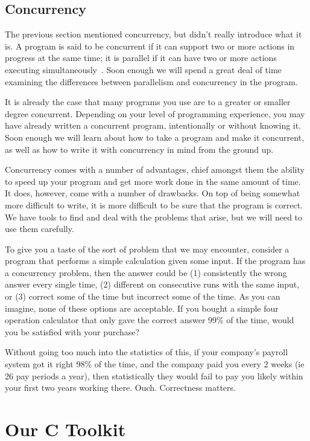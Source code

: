 \subsection*{Concurrency}

The previous section mentioned concurrency, but didn't really introduce what it is. A program is said to be concurrent if it can support two or more actions in progress at the same time; it is parallel if it can have two or more actions executing simultaneously~\cite{artofc}. Soon enough we will spend a great deal of time examining the differences between parallelism and concurrency in the program.

It is already the case that many programs you use are to a greater or smaller degree concurrent. Depending on your level of programming experience, you may have already written a concurrent program, intentionally or without knowing it. Soon enough we will learn about how to take a program and make it concurrent, as well as how to write it with concurrency in mind from the ground up.

Concurrency comes with a number of advantages, chief amongst them the ability to speed up your program and get more work done in the same amount of time. It does, however, come with a number of drawbacks. On top of being somewhat more difficult to write, it is more difficult to be sure that the program is correct. We have tools to find and deal with the problems that arise, but we will need to use them carefully.

To give you a taste of the sort of problem that we may encounter, consider a program that performs a simple calculation given some input. If the program has a concurrency problem,  then the answer could be (1) consistently the wrong answer every single time, (2) different on consecutive runs with the same input, or (3) correct some of the time but incorrect some of the time. As you can imagine, none of these options are acceptable. If you bought a simple four operation calculator that only gave the correct answer 99\% of the time, would you be satisfied with your purchase? 

Without going too much into the statistics of this, if your company's payroll system got it right 98\% of the time, and the company paid you every 2 weeks (ie 26 pay periods a year), then statistically they would fail to pay you likely within your first two years working there. Ouch. Correctness matters.

\section*{Our C Toolkit}

